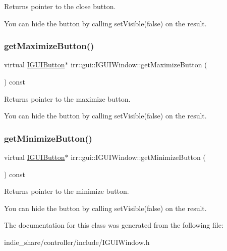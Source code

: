 Returns pointer to the close button. 

You can hide the button by calling set\+Visible(false) on the result. \mbox{\label{classirr_1_1gui_1_1IGUIWindow_a7b5976907664ed8603f3a603079d3b15}} 
\subsubsection{\texorpdfstring{get\+Maximize\+Button()}{getMaximizeButton()}}
{\footnotesize\ttfamily virtual \hyperlink{classirr_1_1gui_1_1IGUIButton}{I\+G\+U\+I\+Button}$\ast$ irr\+::gui\+::\+I\+G\+U\+I\+Window\+::get\+Maximize\+Button (\begin{DoxyParamCaption}{ }\end{DoxyParamCaption}) const\hspace{0.3cm}{\ttfamily [pure virtual]}}



Returns pointer to the maximize button. 

You can hide the button by calling set\+Visible(false) on the result. \mbox{\label{classirr_1_1gui_1_1IGUIWindow_a9c9b5060ca57c46bfece1339ef30facb}} 
\subsubsection{\texorpdfstring{get\+Minimize\+Button()}{getMinimizeButton()}}
{\footnotesize\ttfamily virtual \hyperlink{classirr_1_1gui_1_1IGUIButton}{I\+G\+U\+I\+Button}$\ast$ irr\+::gui\+::\+I\+G\+U\+I\+Window\+::get\+Minimize\+Button (\begin{DoxyParamCaption}{ }\end{DoxyParamCaption}) const\hspace{0.3cm}{\ttfamily [pure virtual]}}



Returns pointer to the minimize button. 

You can hide the button by calling set\+Visible(false) on the result. 

The documentation for this class was generated from the following file\+:\begin{DoxyCompactItemize}
\item 
indie\+\_\+share/controller/include/I\+G\+U\+I\+Window.\+h\end{DoxyCompactItemize}
